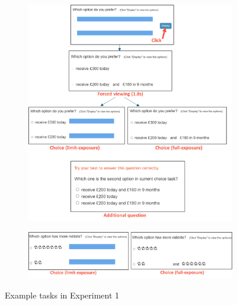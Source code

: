 \documentclass[
  12pt,
]{article}
\begin{document}
\begin{figure}
  \centering
  \begin{subfigure}{\textwidth}
    \centering
    \includegraphics[width=\linewidth]{figures/exp3_screenshot_intertemporal.png}
  \end{subfigure}
  \begin{subfigure}{\textwidth}
    \vspace{2.5em}
    \centering
    \includegraphics[width=\linewidth]{figures/exp3_screenshot_rabbit.png}
  \end{subfigure}
  \caption{Example tasks in Experiment 1}
  \label{fig:exp3_screenshot}
\end{figure}
\end{document}
